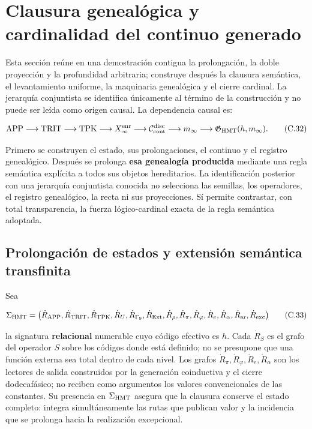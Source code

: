 \section{Clausura genealógica y cardinalidad del continuo generado}
\label{sec:cierre-cardinal-nativo}

Esta sección reúne en una demostración contigua la prolongación, la doble
proyección y la profundidad arbitraria; construye después la clausura
semántica, el levantamiento uniforme, la maquinaria genealógica y el cierre
cardinal. La jerarquía conjuntista se identifica únicamente al término de la
construcción y no puede ser leída como origen causal. La dependencia causal es:

\[
 \mathrm{APP}\longrightarrow\mathrm{TRIT}\longrightarrow\mathrm{TPK}
 \longrightarrow X_\infty^{\rm enr}
 \longrightarrow\mathcal C_{\rm cont}^{\rm disc}
 \longrightarrow m_\infty
 \longrightarrow\mathfrak G_{\rm HMT}(h,m_\infty).
\tag{C.32}\label{eq:ch-cadena-causal}
\]

Primero se construyen el estado, sus prolongaciones, el continuo y el registro genealógico.
Después se prolonga \textbf{esa genealogía producida} mediante una regla semántica
explícita a todos sus objetos hereditarios. La identificación posterior con
una jerarquía conjuntista conocida no selecciona las semillas, los operadores,
el registro genealógico, la recta ni sus proyecciones. Sí permite contrastar, con total
transparencia, la fuerza lógico-cardinal exacta de la regla semántica adoptada.

\subsection{Prolongación de estados y extensión semántica transfinita}

Sea

\[
 \Sigma_{\rm HMT}
 =\bigl(\dot R_{\rm APP},\dot R_{\rm TRIT},\dot R_{\rm TPK},
 \dot R_{U},\dot R_{\Gamma_9},\dot R_{\rm Ext},\dot R_\rho,
 \dot R_{\pi},\dot R_{\varphi},\dot R_e,\dot R_{\alpha},
 \dot R_{\rm ar},\dot R_{\rm exc}\bigr)
\tag{C.33}\label{eq:ch-signatura}
\]

la signatura \textbf{relacional} numerable cuyo código efectivo es \(h\). Cada
\(\dot R_S\) es el grafo del operador \(S\) sobre los códigos donde está
definido; no se presupone que una función externa sea total dentro de cada
nivel. Los grafos \(\dot R_{\pi},\dot R_{\varphi},\dot R_e,\dot R_{\alpha}\)
son los lectores de salida construidos por la generación coinductiva y el
cierre dodecafásico; no reciben como argumentos los valores convencionales de
las constantes. Su presencia en \(\Sigma_{\rm HMT}\) asegura que la clausura
conserve el estado completo: integra simultáneamente las rutas que publican
valor y la incidencia que se prolonga hacia la realización excepcional.

